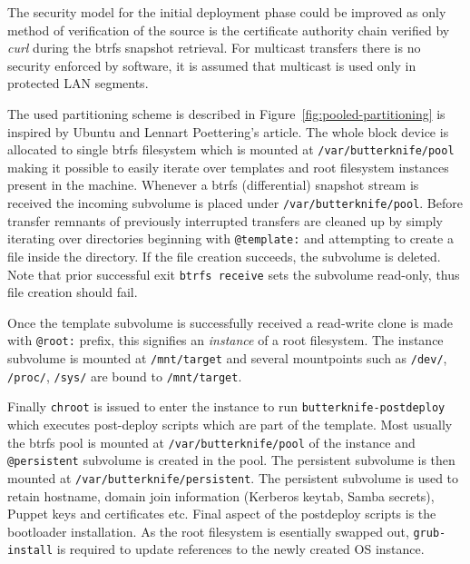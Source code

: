 \documentclass[a4paper,11pt]{kth-mag}
\begin{document}
The security model for the initial deployment phase could be improved
as only method of verification of the source is the certificate
authority chain verified by \emph{curl} during the \acrshort{btrfs} snapshot
retrieval. For multicast transfers there is no security
enforced by software, it is assumed that multicast is used only
in protected LAN segments.

The used partitioning scheme is described in Figure~\ref{fig:pooled-partitioning}
is inspired by Ubuntu and Lennart Poettering's article.
\cite{revisiting-how-we-put-together-linux-systems}
The whole block device is allocated to single \acrshort{btrfs} filesystem
which is mounted at \lstinline!/var/butterknife/pool! making
it possible to easily iterate over templates and root filesystem instances
present in the machine.
Whenever a \acrshort{btrfs} (differential) snapshot stream is received
the incoming subvolume is placed under \lstinline!/var/butterknife/pool!.
Before transfer remnants of previously interrupted transfers are cleaned
up by simply iterating over directories beginning with \lstinline!@template:!
and attempting to create a file inside the directory.
If the file creation succeeds, the subvolume is deleted.
Note that prior successful exit \lstinline!btrfs receive! sets the
subvolume read-only, thus file creation should fail.

Once the template subvolume is successfully received
a read-write clone is made with \lstinline!@root:! prefix,
this signifies an \emph{instance} of a root filesystem.
The instance subvolume is mounted at \lstinline!/mnt/target!
and several mountpoints such as \lstinline!/dev/!,
\lstinline!/proc/!, \lstinline!/sys/! are bound to \lstinline!/mnt/target!.

Finally \lstinline!chroot! is issued to enter the instance to
run \lstinline!butterknife-postdeploy! which executes
post-deploy scripts which are part of the template.
Most usually the \acrshort{btrfs} pool is mounted at \lstinline!/var/butterknife/pool!
of the instance and \lstinline!@persistent! subvolume is created
in the pool.
The persistent subvolume is then mounted at \lstinline!/var/butterknife/persistent!.
The persistent subvolume is used to retain hostname,
domain join information (Kerberos keytab, Samba secrets),
Puppet keys and certificates etc.
Final aspect of the postdeploy scripts is the
bootloader installation.
As the root filesystem is esentially swapped out,
\lstinline!grub-install! is required to update references
to the newly created OS instance.
\end{document}

